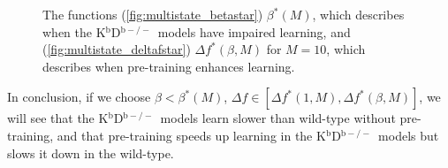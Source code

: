\documentclass[10pt]{article}
\newcommand{\KO}{K$^\mathrm{b}$D$^{\mathrm{b}-/-}$}
\begin{document}
\begin{figure}
 \begin{center}
 \begin{myenuma}
  \item{}\label{fig:multistate_betastar}
  \item{}\label{fig:multistate_deltafstar}
 \end{myenuma}
 \end{center}
  \caption[The functions $\beta^*(M)$ and $\Delta f^*(\beta,M)$]{The functions (\ref{fig:multistate_betastar}) $\beta^*(M)$, which describes when the \KO\ models have impaired learning, and (\ref{fig:multistate_deltafstar}) $\Delta f^*(\beta,M)$ for $M=10$, which describes when pre-training enhances learning.}\label{fig:multistate_star}
\end{figure}

In conclusion, if we choose $\beta<\beta^*(M)$, $\Delta f \in [\Delta f^*(1,M),\Delta f^*(\beta,M)]$, we will see that the \KO\ models learn slower than wild-type without pre-training, and that pre-training speeds up learning in the \KO\ models but slows it down in the wild-type.
\end{document}
